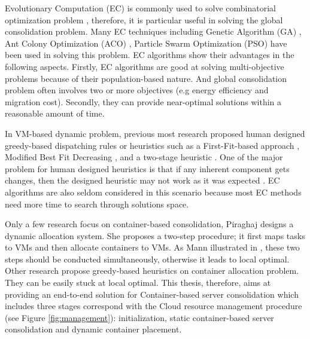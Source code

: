Evolutionary Computation (EC) is commonly used to solve combinatorial optimization problem \cite{Guzek:2015ds}, therefore, it is particular useful in solving the global consolidation problem.  Many EC techniques including Genetic Algorithm (GA) \cite{Xu:2010vh}, Ant Colony Optimization (ACO) \cite{Gao:2013gg, Mateos:2013bm}, Particle Swarm Optimization (PSO) \cite{Jeyarani:2012fg} have been used in solving this problem. EC algorithms show their advantages in the following aspects. Firstly, EC algorithms are good at solving multi-objective problems because of their population-based nature. And global consolidation problem often involves two or more objectives (e.g energy efficiency and migration cost). Secondly,  they can provide near-optimal solutions within a reasonable amount of time.  

In VM-based dynamic problem, 
previous most research proposed human designed greedy-based dispatching rules or heuristics such as a First-Fit-based approach \cite{Bobroff:2007ec}, Modified Best Fit Decreasing \cite{Beloglazov:2012ji}, and a two-stage heuristic \cite{Zhang:2015jm}. One of the major problem for human designed heuristics is that if any inherent component gets changes, then the designed heuristic may not work as it was expected \cite{SoteloFigueroa:2013be}. EC algorithms are also seldom considered in this scenario because most EC methods need more time to search through solutions space.

Only a few research focus on container-based consolidation, Piraghaj \cite{Piraghaj:2016bw} designs a dynamic allocation system. She proposes a two-step procedure; it first maps tasks to VMs and then allocate containers to VMs. As Mann illustrated in \cite{Mann:2016hx},  these two steps should be conducted simultaneously, otherwise it leads to local optimal. Other research \cite{Dong:2014iz, Hindman:2011ux, Anselmi:2008ik} propose greedy-based heuristics on container allocation problem. They can be easily stuck at local optimal. 
This thesis, therefore, aims at providing an end-to-end solution for Container-based server consolidation which includes three stages correspond with the Cloud resource management procedure (see Figure \ref{fig:management}): initialization, static container-based server consolidation and dynamic container placement.


